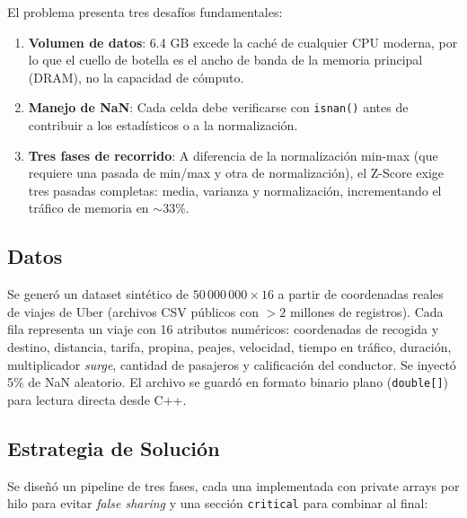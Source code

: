 \documentclass[10pt,a4paper]{article}
\begin{document}
El problema presenta tres desaf\'ios fundamentales:
\begin{enumerate}
    \item \textbf{Volumen de datos}: 6.4 GB excede la cach\'e de cualquier CPU
        moderna, por lo que el cuello de botella es el ancho de banda de la
        memoria principal (DRAM), no la capacidad de c\'omputo.
    \item \textbf{Manejo de NaN}: Cada celda debe verificarse con
        \texttt{isnan()} antes de contribuir a los estad\'isticos o a la
        normalizaci\'on.
    \item \textbf{Tres fases de recorrido}: A diferencia de la normalizaci\'on
        min-max (que requiere una pasada de min/max y otra de normalizaci\'on),
        el Z-Score exige tres pasadas completas: media, varianza y
        normalizaci\'on, incrementando el tr\'afico de memoria en $\sim$33\%.
\end{enumerate}

\subsection{Datos}

Se gener\'o un dataset sint\'etico de $50\,000\,000 \times 16$ a partir de
coordenadas reales de viajes de Uber (archivos CSV p\'ublicos con $>2$ millones
de registros). Cada fila representa un viaje con 16 atributos num\'ericos:
coordenadas de recogida y destino, distancia, tarifa, propina, peajes,
velocidad, tiempo en tr\'afico, duraci\'on, multiplicador \emph{surge},
cantidad de pasajeros y calificaci\'on del conductor. Se inyect\'o 5\% de NaN
aleatorio. El archivo se guard\'o en formato binario plano (\texttt{double[]})
para lectura directa desde C++.

\subsection{Estrategia de Soluci\'on}

Se dise\~n\'o un pipeline de tres fases, cada una implementada con private
arrays por hilo para evitar \emph{false sharing} y una secci\'on
\texttt{critical} para combinar al final:
\end{document}

